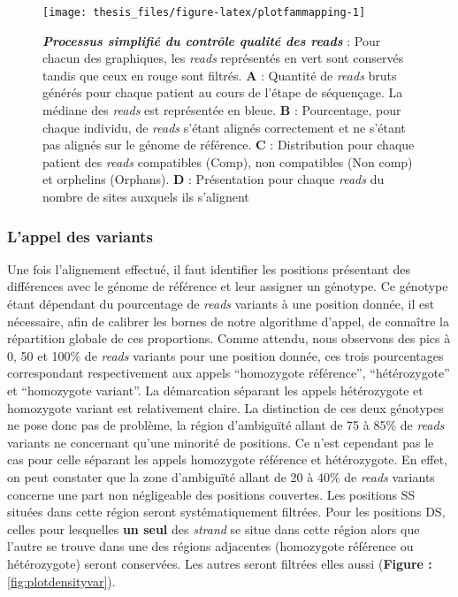 \documentclass[12pt,a4paper,twoside]{ugathesis}
\theoremstyle{definition}
\theoremstyle{definition}
\theoremstyle{definition}
\theoremstyle{remark}
\begin{document}
\begin{figure}

{\centering \texttt{[image: thesis\_files/figure-latex/plotfammapping-1]} 

}

\caption[Processus simplifié du contrôle qualité des
\emph{reads}\\]{\textbf{\emph{Processus simplifié du contrôle
qualité des \emph{reads}}} : Pour chacun des graphiques, les
\emph{reads} représentés en vert sont conservés tandis que ceux en rouge
sont filtrés. \textbf{A} : Quantité de \emph{reads} bruts générés pour
chaque patient au cours de l'étape de séquençage. La médiane des
\emph{reads} est représentée en bleue. \textbf{B} : Pourcentage, pour
chaque individu, de \emph{reads} s'étant alignés correctement et ne
s'étant pas alignés sur le génome de référence. \textbf{C} :
Distribution pour chaque patient des \emph{reads} compatibles (Comp),
non compatibles (Non comp) et orphelins (Orphans). \textbf{D} :
Présentation pour chaque \emph{reads} du nombre de sites auxquels ils
s'alignent}\label{fig:plotfammapping}
\end{figure}
















\newpage

\subsubsection{L'appel des variants}\label{lappel-des-variants-1}

Une fois l'alignement effectué, il faut identifier les positions
présentant des différences avec le génome de référence et leur assigner
un génotype. Ce génotype étant dépendant du pourcentage de \emph{reads}
variants à une position donnée, il est nécessaire, afin de calibrer les
bornes de notre algorithme d'appel, de connaître la répartition globale
de ces proportions. Comme attendu, nous observons des pics à 0, 50 et
100\% de \emph{reads} variants pour une position donnée, ces trois
pourcentages correspondant respectivement aux appels ``homozygote
référence'', ``hétérozygote'' et ``homozygote variant''. La démarcation
séparant les appels hétérozygote et homozygote variant est relativement
claire. La distinction de ces deux génotypes ne pose donc pas de
problème, la région d'ambiguïté allant de 75 à 85\% de \emph{reads}
variants ne concernant qu'une minorité de positions. Ce n'est cependant
pas le cas pour celle séparant les appels homozygote référence et
hétérozygote. En effet, on peut constater que la zone d'ambiguïté allant
de 20 à 40\% de \emph{reads} variants concerne une part non négligeable
des positions couvertes. Les positions SS situées dans cette région
seront systématiquement filtrées. Pour les positions DS, celles pour
lesquelles \textbf{un seul} des \emph{strand} se situe dans cette région
alors que l'autre se trouve dans une des régions adjacentes (homozygote
référence ou hétérozygote) seront conservées. Les autres seront filtrées
elles aussi (\textbf{Figure : }\ref{fig:plotdensityvar}).
\end{document}
